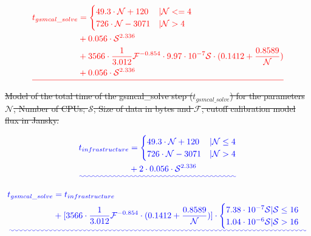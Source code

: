 \documentclass[preprint,5p]{elsarticle}
\providecommand{\DIFadd}[1]{{\protect\color{blue}\uwave{#1}}} %
\providecommand{\DIFdel}[1]{{\protect\color{red}\sout{#1}}}                      %
\providecommand{\DIFaddbegin}{} %
\providecommand{\DIFdelbegin}{} %
\providecommand{\DIFdelend}{} %
\newcommand{\DIFscaledelfig}{0.5}
\newlength{\DIFdelgraphicswidth} %
\newlength{\DIFdelgraphicsheight} %
\newcommand{\DIFaddincludegraphics}[2][]{{\color{blue}\fbox{\DIFOincludegraphics[#1]{#2}}}} %
\newcommand{\DIFdelincludegraphics}[2][]{%
\sbox{\DIFdelgraphicsbox}{\DIFOincludegraphics[#1]{#2}}%
\settoboxwidth{\DIFdelgraphicswidth}{\DIFdelgraphicsbox} %
\settoboxtotalheight{\DIFdelgraphicsheight}{\DIFdelgraphicsbox} %
\scalebox{\DIFscaledelfig}{%
\parbox[b]{\DIFdelgraphicswidth}{\usebox{\DIFdelgraphicsbox}\\[-\baselineskip] \rule{\DIFdelgraphicswidth}{0em}}\llap{\resizebox{\DIFdelgraphicswidth}{\DIFdelgraphicsheight}{%
\setlength{\unitlength}{\DIFdelgraphicswidth}%
\begin{picture}(1,1)%
\thicklines\linethickness{2pt} %
{\color[rgb]{1,0,0}\put(0,0){\framebox(1,1){}}}%
{\color[rgb]{1,0,0}\put(0,0){\line( 1,1){1}}}%
{\color[rgb]{1,0,0}\put(0,1){\line(1,-1){1}}}%
\end{picture}%
}\hspace*{3pt}}} %
} %
\DeclareRobustCommand{\DIFaddbegin}{\DIFOaddbegin \let\includegraphics\DIFaddincludegraphics} %
\DeclareRobustCommand{\DIFdelbegin}{\DIFOdelbegin \let\includegraphics\DIFdelincludegraphics} %
\DeclareRobustCommand{\DIFdelend}{\DIFOaddend \let\includegraphics\DIFOincludegraphics} %
\begin{document}
\begin{equ*}[!t]
\normalsize
\DIFdelbegin \begin{displaymath}
    \DIFdel{\begin{split}
   t_{gsmcal\_solve} & = \begin{cases}
        49.3\cdot\mathcal{N}+ 120 &|\mathcal{N}<=4\\
        726\cdot\mathcal{N}-3071 & |\mathcal{N}>4
       \end{cases} \\
       & + 0.056\cdot \mathcal{S}^{2.336} \\ 
       & + 3566\cdot \frac{1}{3.012}\mathcal{F}^{-0.854} \cdot 9.97\cdot10^{-7}\mathcal{S}\cdot (0.1412+\frac{0.8589}{\mathcal{N}}) \\
       & + 0.056\cdot \mathcal{S}^{2.336} 
       \end{split}
 \label{eq:full_model}
 }\end{displaymath}
{%
\DIFdel{Model of the total time of the gsmcal\_solve step ($t_{gsmcal\_solve}$) for the parameters $\mathcal{N}$, Number of CPUs; $\mathcal{S}$, Size of data in bytes and $\mathcal{F}$, cutoff calibration model flux in Jansky. }}
\DIFdelend 

\DIFaddbegin \begin{equation}
 \DIFadd{\begin{split}
   t_{infrastructure} & = \begin{cases}
        49.3\cdot\mathcal{N}+ 120 &|\mathcal{N}\leq4\\
        726\cdot\mathcal{N}-3071 & |\mathcal{N}>4
       \end{cases} \\
       & + 2 \cdot 0.056\cdot \mathcal{S}^{2.336} 
       \end{split}
 }\end{equation}

\begin{equation}
    \DIFadd{\begin{split}
   t_{gsmcal\_solve} & = t_{infrastructure} \\
       & + [3566\cdot \frac{1}{3.012}\mathcal{F}^{-0.854} \cdot (0.1412+\frac{0.8589}{\mathcal{N}}) ]  \cdot
          \begin{cases} 
             7.38\cdot10^{-7}\mathcal{S} | \mathcal{S}\leq16\\
             1.04\cdot10^{-6}\mathcal{S} | \mathcal{S}>16 
          \end{cases}\\
       \end{split}
 \label{eq:full_model_gsmcal}
 }\end{equation}


\end{equ*}
\end{document}
